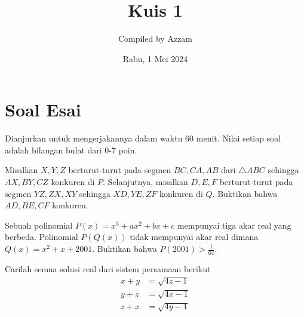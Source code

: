 \documentclass[12pt]{scrartcl}
\begin{document}
	\title{Kuis 1} %
	\date{Rabu, 1 Mei 2024}
	\author{Compiled by Azzam}
	\maketitle

\renewcommand*\contentsname{Daftar Isi}
\tableofcontents

\newpage
	
\section{Soal Esai}
Dianjurkan untuk mengerjakannya dalam waktu 60 menit. Nilai setiap soal adalah bilangan bulat dari 0-7 poin.   
    \begin{soalbaru}
        Misalkan $X,Y,Z$ berturut-turut pada segmen $BC,CA,AB$ dari $\triangle ABC$ sehingga $AX, BY, CZ$ konkuren di $P$. Selanjutnya, misalkan $D,E,F$ berturut-turut pada segmen $YZ,ZX,XY$ sehingga $XD,YE,ZF$ konkuren di $Q$. Buktikan bahwa $AD,BE,CF$ konkuren.
    \end{soalbaru}


    \begin{soalbaru}
		Sebuah polinomial $P(x)=x^3+ax^2+bx+c$ mempunyai tiga akar real yang berbeda. Polinomial $P(Q(x))$ tidak mempunyai akar real dimana $Q(x)=x^2+x+2001$. Buktikan bahwa $P(2001)>\frac{1}{64}$.
    \end{soalbaru}	

    \begin{soalbaru}
        Carilah semua solusi real dari sistem persamaan berikut
	\begin{align*}
		x+y &= \sqrt{4z-1} \\
		y+z &= \sqrt{4x-1} \\
		z+x &= \sqrt{4y-1}
	\end{align*}
    \end{soalbaru}
\end{document}
